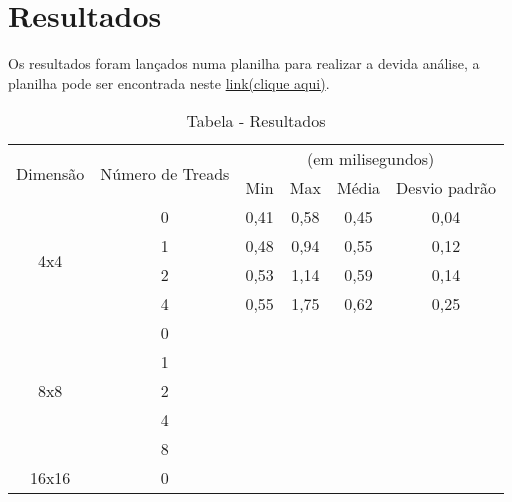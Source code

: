 \newpage
\onecolumn
\section{Resultados}
Os resultados foram lançados numa planilha para realizar a devida análise, a planilha pode ser encontrada neste \href{https://docs.google.com/a/ufrn.edu.br/spreadsheets/d/1tey8rUazIv3H-rDvTVuX3HWysaB38WmbdmQCpsBp2zY/edit?usp=sharing}{link(clique aqui)}.
\begin{table}[!h]
	\centering
	\caption{Tabela - Resultados}
	\label{Tabela Resultados}
	\begin{tabular}{|c|c|cccc|}
		\hline
		\multirow{2}{*}{Dimensão} & \multirow{2}{*}{Número de Treads} & \multicolumn{4}{c}{(em milisegundos)} \\
		&                                   & Min  & Max  & Média  & Desvio padrão  \\ \hline\hline
		\multirow{4}{*}{4x4}      & 0                                &  0,41    &  0,58    &   0,45     &      0,04          \\
		& 1                                 &    0,48  &   0,94   &   0,55     &  0,12              \\
		& 2                                 &   0,53   & 1,14     & 0,59       &    0,14           \\
		& 4                                 &   0,55   &   1,75   &   0,62     &         0,25       \\ \hline
		\multirow{5}{*}{8x8}      & 0                                &      &      &        &                \\
		& 1                                 &      &      &        &                \\
		& 2                                 &      &      &        &                \\
		& 4                                 &      &      &        &                \\
		& 8                                 &      &      &        &                \\ \hline
		\multirow{6}{*}{16x16}      & 0                                &      &      &        &                \\

\end{tabular}
\end{table}
